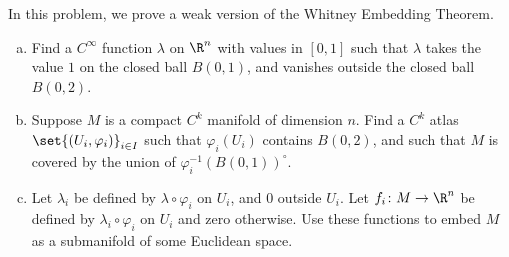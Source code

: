 \documentclass[10pt]{mypackage}
\begin{document}
\begin{problem}[Problem 5]
  In this problem, we prove a weak version of the Whitney Embedding Theorem.
  \begin{enumerate}[(a)]
    \item Find a $C^{\infty}$ function $\lambda$ on $\R^{n}$ with values in $[0,1]$ such that $\lambda$ takes the value $1$ on the closed ball $B\left( 0,1 \right)$, and vanishes outside the closed ball $B\left( 0,2 \right)$.
    \item Suppose $M$ is a compact $C^{k}$ manifold of dimension $n$. Find a $C^{k}$ atlas $\set{\left( U_i,\varphi_i \right)}_{i\in I}$ such that $\varphi_i\left( U_i \right)$ contains $B\left( 0,2 \right)$, and such that $M$ is covered by the union of $\varphi_i^{-1}\left( B\left( 0,1 \right) \right)^{\circ}$.
    \item Let $\lambda_i$ be defined by $\lambda\circ\varphi_i$ on $U_i$, and $0$ outside $U_i$. Let $f_i\colon M\rightarrow \R^n$ be defined by $\lambda_i\circ\varphi_i$ on $U_i$ and zero otherwise. Use these functions to embed $M$ as a submanifold of some Euclidean space.
  \end{enumerate}
\end{problem}
\end{document}
